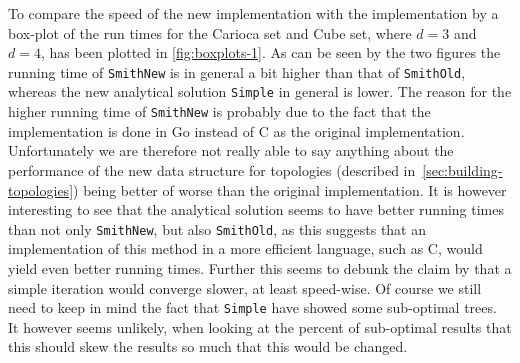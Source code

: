 To compare the speed of the new implementation with the implementation by
\textcite{smith1992} a box-plot of the run times for the Carioca set and Cube
set, where $d = 3$ and $d = 4$, has been plotted in \cref{fig:boxplots-1}. As
can be seen by the two figures the running time of \texttt{SmithNew} is in
general a bit higher than that of \texttt{SmithOld}, whereas the new analytical
solution \texttt{Simple} in general is lower. The reason for the higher running
time of \texttt{SmithNew} is probably due to the fact that the implementation is
done in Go instead of C as the original implementation. Unfortunately we are
therefore not really able to say anything about the performance of the new data
structure for topologies (described in~\cref{sec:building-topologies}) being
better of worse than the original implementation. It is however interesting to
see that the analytical solution seems to have better running times than not
only \texttt{SmithNew}, but also \texttt{SmithOld}, as this suggests that an
implementation of this method in a more efficient language, such as C, would
yield even better running times. Further this seems to debunk the claim by
\textcite{smith1992} that a simple iteration would converge slower, at least
speed-wise. Of course we still need to keep in mind the fact that
\texttt{Simple} have showed some sub-optimal trees. It however seems unlikely,
when looking at the percent of sub-optimal results that this should skew the
results so much that this would be changed.

